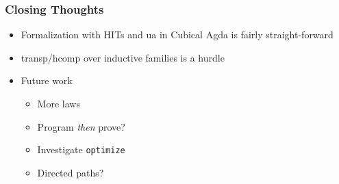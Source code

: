 \documentclass{beamer}
\begin{document}
\begin{frame}
  \frametitle{Closing Thoughts}
  \begin{itemize}
  \item Formalization with HITs and ua in Cubical Agda is fairly
    straight-forward
  \item transp/hcomp over inductive families is a hurdle
  \item Future work
    \begin{itemize}
    \item More laws
    \item Program \emph{then} prove?
    \item Investigate \texttt{optimize}
    \item Directed paths?
    \end{itemize}
  \end{itemize}
\end{frame}
\end{document}
